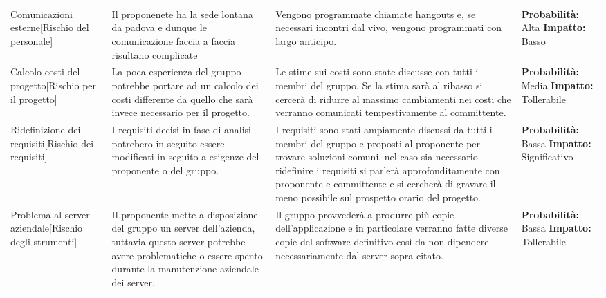 \documentclass[../piano-di-progetto.tex]{subfiles}
\begin{document}
\begin{longtable}{|p{10em}|p{13em}|p{13em}|p{10em}|}
  Comunicazioni esterne[Rischio del personale] & Il proponenete ha la sede lontana da padova e dunque le comunicazione faccia a faccia risultano complicate & Vengono programmate chiamate hangouts e, se necessari incontri dal vivo, vengono programmati con largo anticipo. & \textbf{Probabilità: }   Alta \textbf{Impatto: }   Basso\\
  Calcolo costi del progetto[Rischio per il progetto] & La poca esperienza del gruppo potrebbe portare ad un calcolo dei costi differente da quello che sarà invece necessario per il progetto. & Le stime sui costi sono state discusse con tutti i membri del gruppo. Se la stima sarà al ribasso si cercerà di ridurre al massimo cambiamenti nei costi che verranno comunicati tempestivamente al committente. & \textbf{Probabilità: }  Media \textbf{Impatto: } Tollerabile\\
  Ridefinizione dei requisiti[Rischio dei requisiti] & I requisiti decisi in fase di analisi potrebero in seguito essere modificati in seguito a esigenze del proponente o del gruppo. & I requisiti sono stati ampiamente discussi da tutti i membri del gruppo e proposti al proponente per trovare soluzioni comuni, nel caso sia necessario ridefinire i requisiti si parlerà approfonditamente con proponente e committente e si cercherà di gravare il meno possibile sul prospetto orario del progetto. & \textbf{Probabilità: }  Bassa \textbf{Impatto: }  Significativo\\
  Problema al server aziendale[Rischio degli strumenti] & Il proponente mette a disposizione del gruppo un server dell'azienda, tuttavia questo server potrebbe avere problematiche o essere spento durante la manutenzione aziendale dei server. & Il gruppo provvederà a produrre più copie dell'applicazione e in particolare verranno fatte diverse copie del software definitivo così da non dipendere necessariamente dal server sopra citato. & \textbf{Probabilità: }  Bassa \textbf{Impatto: } Tollerabile\\
  \hline
  \end{longtable}

  
\end{document}
